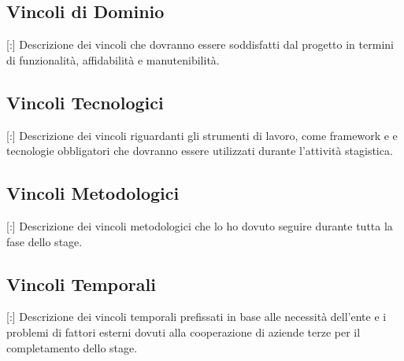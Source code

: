 \subsection{Vincoli di Dominio}

[:] Descrizione dei vincoli che dovranno essere soddisfatti dal progetto in termini di funzionalità, affidabilità e manutenibilità. 

\subsection{Vincoli Tecnologici}

[:] Descrizione dei vincoli riguardanti gli strumenti di lavoro, come framework e  e tecnologie obbligatori che dovranno essere utilizzati durante l'attività stagistica.

\subsection{Vincoli Metodologici}

[:] Descrizione dei vincoli metodologici che lo ho dovuto seguire durante tutta la fase dello stage.

\subsection{Vincoli Temporali}

[:] Descrizione dei vincoli temporali prefissati in base alle necessità dell'ente e i problemi di fattori esterni dovuti alla cooperazione di aziende terze per il completamento dello stage.
